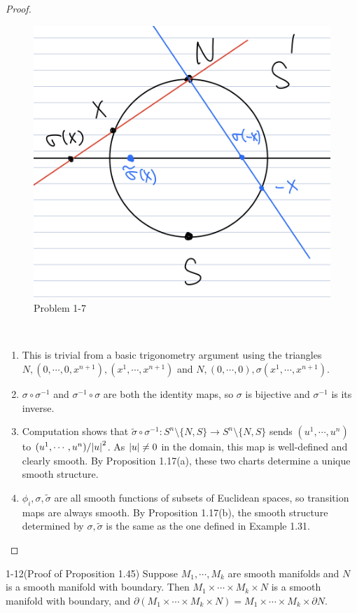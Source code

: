 \begin{proof}
  \begin{figure}[!htb]
    \includegraphics[width=.5\linewidth]{img/problem_1_7.jpeg}
    \caption{Problem 1-7}
    \label{fig:problem_1_7}
  \end{figure}
  $ $
  \begin{enumerate}[label=(\alph*)]
    \item 
      This is trivial from a basic trigonometry argument using the triangles $N, (0, \cdots, 0, x^{n + 1}), (x^1, \cdots, x^{n + 1})$ and $N, (0, \cdots, 0), \sigma(x^1, \cdots, x^{n + 1})$.
    \item
      $\sigma \circ \sigma^{-1}$ and $\sigma^{-1} \circ \sigma$ are both the identity maps, so $\sigma$ is bijective and $\sigma^{-1}$ is its inverse.
    \item
      Computation shows that $\tilde{\sigma} \circ \sigma^{-1}: S^n \setminus \{ N, S \} \rightarrow S^n \setminus \{ N, S \}$ sends $(u^1, \cdots, u^n)$ to $(u^1, \cdots, u^n) / \abs{u}^2$.
      As $\abs{u} \ne 0$ in the domain, this map is well-defined and clearly smooth.
      By Proposition 1.17(a), these two charts determine a unique smooth structure.
    \item
      $\phi_i, \sigma, \tilde{\sigma}$ are all smooth functions of subsets of Euclidean spaces, so transition maps are always smooth.
      By Proposition 1.17(b), the smooth structure determined by $\sigma, \tilde{\sigma}$ is the same as the one defined in Example 1.31.
  \end{enumerate}
\end{proof}

\begin{customprob}{1-12(Proof of Proposition 1.45)}
  Suppose $M_1, \cdots, M_k$ are smooth manifolds and $N$ is a smooth manifold with boundary.
  Then $M_1 \times \cdots \times M_k \times N$ is a smooth manifold with boundary, and $\partial (M_1 \times \cdots \times M_k \times N) = M_1 \times \cdots \times M_k \times \partial N$.
\end{customprob}

